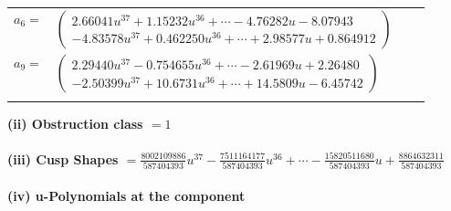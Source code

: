 \documentclass[1p]{elsarticle_modified}
\theoremstyle{definition}
\begin{document}
\begin{tabular}{m{7pt} m{180pt} m{7pt} m{180pt} }
\flushright $a_{6}=$&$\begin{pmatrix}2.66041 u^{37}+1.15232 u^{36}+\cdots-4.76282 u-8.07943\\-4.83578 u^{37}+0.462250 u^{36}+\cdots+2.98577 u+0.864912\end{pmatrix}$ \\
\flushright $a_{9}=$&$\begin{pmatrix}2.29440 u^{37}-0.754655 u^{36}+\cdots-2.61969 u+2.26480\\-2.50399 u^{37}+10.6731 u^{36}+\cdots+14.5809 u-6.45742\end{pmatrix}$\\&\end{tabular}
\flushleft \textbf{(ii) Obstruction class $= 1$}\\~\\
\flushleft \textbf{(iii) Cusp Shapes $= \frac{8002109886}{587404393} u^{37}-\frac{7511164177}{587404393} u^{36}+\cdots-\frac{15820511680}{587404393} u+\frac{8864632311}{587404393}$}\\~\\
\newpage\renewcommand{\arraystretch}{1}
\flushleft \textbf{(iv) u-Polynomials at the component}\newline \\
\end{document}
